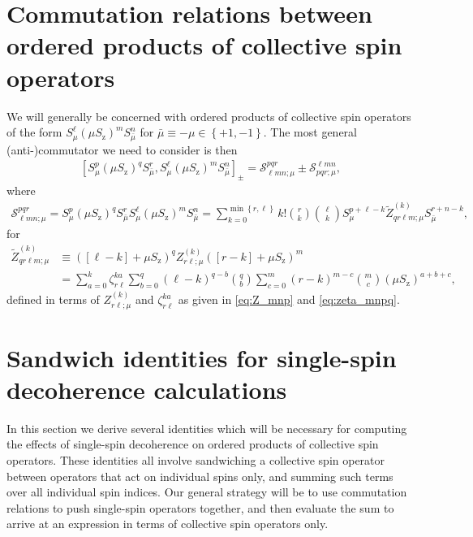 \documentclass[aps,notitlepage,nofootinbib,11pt]{revtex4-1}
\newcommand{\p}[1]{\left(#1\right)} %
\renewcommand{\sp}[1]{\left[#1\right]} %
\renewcommand{\set}[1]{\left\{#1\right\}} %
\renewcommand{\S}{\mathcal{S}}
\newcommand{\z}{\text{z}}
\newcommand{\bmu}{{\bar\mu}}
\newcommand{\1}{\mathds{1}}
\begin{document}
\section{Commutation relations between ordered products of collective
  spin operators}
\label{sec:comm_general}

We will generally be concerned with ordered products of collective
spin operators of the form $S_\mu^\ell \p{\mu S_\z}^m S_\bmu^n$ for
$\bmu\equiv-\mu\in\set{+1,-1}$.  The most general (anti-)commutator we
need to consider is then
\begin{align}
  \sp{S_\mu^p \p{\mu S_\z}^q S_\bmu^r,
    S_\mu^\ell \p{\mu S_\z}^m S_\bmu^n}_\pm
  = \S^{pqr}_{\ell mn;\mu} \pm \S^{\ell mn}_{pqr;\mu},
\end{align}
where
\begin{align}
  \S^{pqr}_{\ell mn;\mu}
  = S_\mu^p \p{\mu S_\z}^q S_\bmu^r
  S_\mu^\ell \p{\mu S_\z}^m S_\bmu^n
  = \sum_{k=0}^{\min\set{r,\ell}} k! { r \choose k } { \ell \choose k }
  S_\mu^{p+\ell-k} \tilde Z_{qr\ell m;\mu}^{(k)} S_\bmu^{r+n-k},
  \label{eq:general_product}
\end{align}
for
\begin{align}
  \tilde Z_{qr\ell m;\mu}^{(k)}
  &\equiv \p{\sp{\ell-k}+\mu S_\z}^q
  Z_{r\ell;\mu}^{(k)} \p{\sp{r-k}+\mu S_\z}^m \\
  &= \sum_{a=0}^k \zeta_{r\ell}^{ka}
  \sum_{b=0}^q \p{\ell-k}^{q-b} { q \choose b }
  \sum_{c=0}^m \p{r-k}^{m-c} { m \choose c }
  \p{\mu S_\z}^{a+b+c},
\end{align}
defined in terms of $Z_{r\ell;\mu}^{(k)}$ and $\zeta_{r\ell}^{ka}$ as
given in \eqref{eq:Z_mnp} and \eqref{eq:zeta_mnpq}.


\section{Sandwich identities for single-spin decoherence calculations}
\label{sec:sandwich_single}

In this section we derive several identities which will be necessary
for computing the effects of single-spin decoherence on ordered
products of collective spin operators.  These identities all involve
sandwiching a collective spin operator between operators that act on
individual spins only, and summing such terms over all individual spin
indices.  Our general strategy will be to use commutation relations to
push single-spin operators together, and then evaluate the sum to
arrive at an expression in terms of collective spin operators only.
\end{document}
